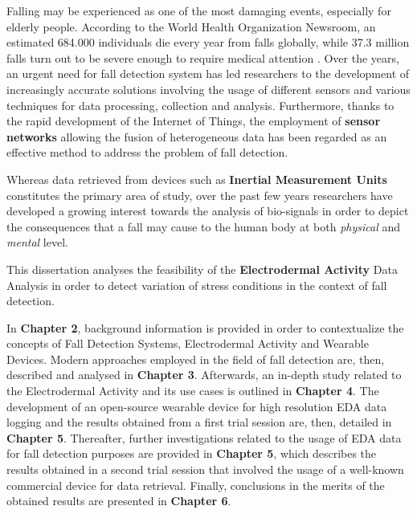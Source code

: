 \label{ch:introduction}

Falling may be experienced as one of the most damaging events, especially for elderly people. According to the World Health Organization Newsroom, an estimated 684.000 individuals die every year from falls globally, while 37.3 million falls turn out to be severe enough to require medical attention \cite{WhoData}. 
Over the years, an urgent need for fall detection system has led researchers to the development of increasingly accurate solutions involving the usage of different sensors and various techniques for data processing, collection and analysis.
Furthermore, thanks to the rapid development of the Internet of Things, the employment of \textbf{sensor networks} allowing the fusion of heterogeneous data has been regarded as an effective method to address the problem of fall detection.

Whereas data retrieved from devices such as \textbf{Inertial Measurement Units} constitutes the primary area of study, over the past few years researchers have developed a growing interest towards the analysis of bio-signals in order to depict the consequences that a fall may cause to the human body at both \textit{physical} and \textit{mental} level.

This dissertation analyses the feasibility of the \textbf{Electrodermal Activity} Data Analysis in order to detect variation of stress conditions in the context of fall detection. 

In \textbf{Chapter 2}, background information is provided in order to contextualize the concepts of Fall Detection Systems, Electrodermal Activity and Wearable Devices. Modern approaches employed in the field of fall detection are, then, described and analysed in \textbf{Chapter 3}. Afterwards, an in-depth study related to the Electrodermal Activity and its use cases is outlined in \textbf{Chapter 4}. The development of an open-source wearable device for high resolution EDA data logging and the results obtained from a first trial session are, then, detailed in \textbf{Chapter 5}. Thereafter, further investigations related to the usage of EDA data for fall detection purposes are provided in \textbf{Chapter 5}, which describes the results obtained in a second trial session that involved the usage of a well-known commercial device for data retrieval. Finally, conclusions in the merits of the obtained results are presented in \textbf{Chapter 6}.
